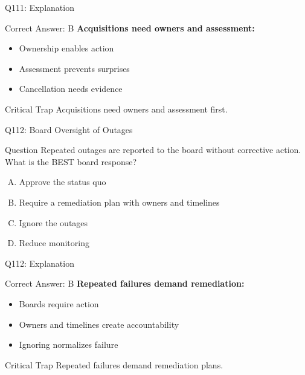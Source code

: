 \documentclass{beamer}
\begin{document}
	\begin{frame}{Q111: Explanation}
		\begin{block}{Correct Answer: B}
			\textbf{Acquisitions need owners and assessment:}
			\begin{itemize}
				\item Ownership enables action
				\item Assessment prevents surprises
				\item Cancellation needs evidence
			\end{itemize}
		\end{block}
		\begin{alertblock}{Critical Trap}
			Acquisitions need owners and assessment first.
		\end{alertblock}
	\end{frame}
	
	\begin{frame}{Q112: Board Oversight of Outages}
		\begin{block}{Question}
			Repeated outages are reported to the board without corrective action. What is the BEST board response?
		\end{block}
		\begin{enumerate}[(A)]
			\item Approve the status quo
			\item Require a remediation plan with owners and timelines
			\item Ignore the outages
			\item Reduce monitoring
		\end{enumerate}
	\end{frame}
	
	\begin{frame}{Q112: Explanation}
		\begin{block}{Correct Answer: B}
			\textbf{Repeated failures demand remediation:}
			\begin{itemize}
				\item Boards require action
				\item Owners and timelines create accountability
				\item Ignoring normalizes failure
			\end{itemize}
		\end{block}
		\begin{alertblock}{Critical Trap}
			Repeated failures demand remediation plans.
		\end{alertblock}
	\end{frame}
	
\end{document}
